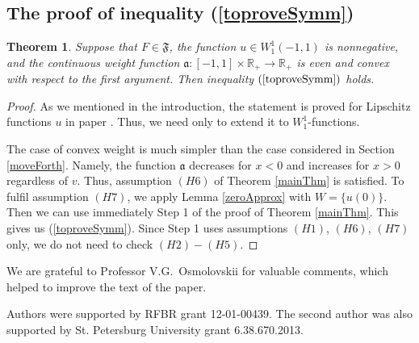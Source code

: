 \documentclass[12pt]{article}
\newcommand{\Real}{\mathbb R}
\newtheorem{thm}{Theorem}
\newcommand{\W}{W_1^1}
\begin{document}
\subsection{The proof of inequality (\ref{toproveSymm})}
\label{sobolevSymm}

\begin{thm}
\label{symmThm}
Suppose that $F \in \mathfrak{F}$, the function $u \in \W(-1, 1)$ is nonnegative,
and the continuous weight function $\mathfrak a: [-1, 1] \times \Real_+ \to \Real_+$
is even and convex with respect to the first argument.
Then inequality $(\ref{toproveSymm})$ holds.
\end{thm}

\begin{proof}
As we mentioned in the introduction,
the statement is proved for Lipschitz functions $u$ in paper \cite{Br}.
Thus, we need only to extend it to $\W$-functions.

The case of convex weight is much simpler than the case considered in Section \ref{moveForth}.
Namely, the function $\mathfrak a$ decreases for $x < 0$ and increases for $x > 0$ regardless of $v$.
Thus, assumption $(H6)$ of Theorem \ref{mainThm} is satisfied.
To fulfil assumption $(H7)$, we apply Lemma \ref{zeroApprox} with $W = \{ u(0) \}$.
Then we can use immediately Step 1 of the proof of Theorem \ref{mainThm}.
This gives us (\ref{toproveSymm}).
Since Step 1 uses assumptions $(H1)$, $(H6)$, $(H7)$ only,
we do not need to check $(H2)-(H5)$.
\end{proof}

\vskip 40pt

We are grateful to Professor V.G.~Osmolovskii for valuable comments,
which helped to improve the text of the paper.

Authors were supported by RFBR grant 12-01-00439.
The second author was also supported by St. Petersburg University grant 6.38.670.2013.
\end{document}
